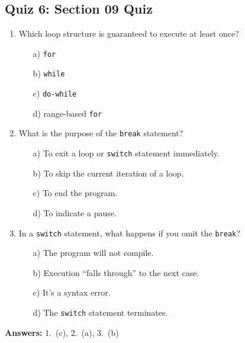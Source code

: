 \subsection{Quiz 6: Section 09 Quiz}
\begin{enumerate}
	\item Which loop structure is guaranteed to execute at least once?
	\begin{enumerate}
		\item[a)] \texttt{for}
		\item[b)] \texttt{while}
		\item[c)] \texttt{do-while}
		\item[d)] range-based \texttt{for}
	\end{enumerate}

	\item What is the purpose of the \texttt{break} statement?
	\begin{enumerate}
		\item[a)] To exit a loop or \texttt{switch} statement immediately.
		\item[b)] To skip the current iteration of a loop.
		\item[c)] To end the program.
		\item[d)] To indicate a pause.
	\end{enumerate}

	\item In a \texttt{switch} statement, what happens if you omit the \texttt{break}?
	\begin{enumerate}
		\item[a)] The program will not compile.
		\item[b)] Execution ``falls through'' to the next case.
		\item[c)] It's a syntax error.
		\item[d)] The \texttt{switch} statement terminates.
	\end{enumerate}
\end{enumerate}

\textbf{Answers:} 1.\ (c), 2.\ (a), 3.\ (b)
